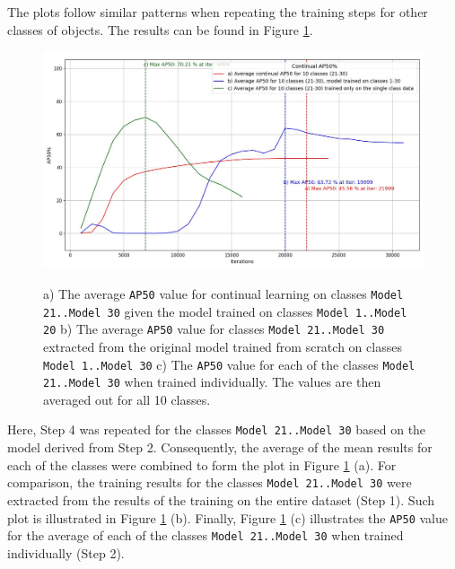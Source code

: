 The plots follow similar patterns when repeating the training steps for other classes of objects. The results can be found in Figure \ref{myModel_continuous_experiment_2}.

\begin{figure}[htb]
	\begin{center}
		\includegraphics[width=14cm]{./continualAP_average_21to30.jpg}
	\end{center}
	\caption{a) The average \texttt{AP50} value for continual learning on classes \texttt{Model 21..Model 30} given the model trained on classes \texttt{Model 1..Model 20}  b) The average \texttt{AP50} value for classes \texttt{Model 21..Model 30} extracted from the original model trained from scratch on classes \texttt{Model 1..Model 30} c)  The \texttt{AP50} value for each of the classes \texttt{Model 21..Model 30} when trained individually. The values are then averaged out for all 10 classes.}
	\begin{center}	\label{myModel_continuous_experiment_2}
	\end{center}
\end{figure}
\FloatBarrier

  
Here, Step 4 was repeated for the classes \texttt{Model 21..Model 30} based on the model derived from Step 2. Consequently, the average of the mean results for each of the classes were combined to form the plot in Figure \ref{myModel_continuous_experiment_2} (a). For  comparison, the training results for the classes \texttt{Model 21..Model 30} were extracted from the results of the training on the entire dataset (Step 1). Such plot is illustrated in Figure \ref{myModel_continuous_experiment_2} (b). Finally, Figure \ref{myModel_continuous_experiment_2} (c) illustrates the \texttt{AP50} value for the average of each of the classes \texttt{Model 21..Model 30} when trained individually (Step 2). 

